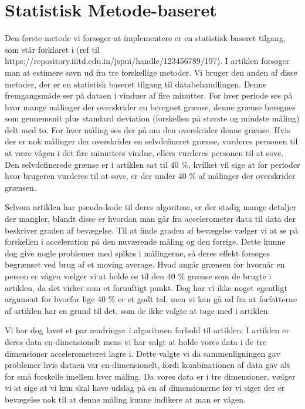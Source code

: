 \section{Statistisk Metode-baseret}
Den første metode vi forsøger at implementere er en statistisk baseret tilgang, som står forklaret i (ref til https://repository.iiitd.edu.in/jspui/handle/123456789/197).
I artiklen forsøger man at estimere søvn ud fra tre forskellige metoder.
Vi bruger den anden af disse metoder, der er en statistisk baseret tilgang til databehandlingen.
Denne fremgangsmåde ser på dataen i vinduer af fire minutter.
For hver periode ses på hvor mange målinger der overskrider en beregnet grænse, denne grænse beregnes som gennemsnit plus standard deviation (forskellen på største og mindste måling) delt med to.
For hver måling ses der på om den overskrider denne grænse.
Hvis der er nok målinger der overskrider en selvdefineret grænse, vurderes personen til at være vågen i det fire minutters vindue, ellers vurderes personen til at sove.
Den selvdefinerede grænse er i artiklen sat til 40 \%, hvilket vil sige at for perioder hvor brugeren vurderes til at sove, er der under 40 \% af målinger der overskrider grænsen.

Selvom artiklen har pseudo-kode til deres algoritme, er der stadig mange detaljer der mangler, blandt disse er hvordan man går fra accelerometer data til data der beskriver graden af bevægelse.
Til at finde graden af bevægelse vælger vi at se på forskellen i acceleration på den nuværende måling og den forrige.
Dette kunne dog give nogle problemer med spikes i målingerne, så deres effekt forsøges begrænset ved brug af et moving average.
Hvad angår grænsen for hvornår en person er vågen vælger vi at holde os til den 40 \% grænse som de brugte i artiklen, da det virker som et fornuftigt punkt.
Dog har vi ikke noget egentligt argument for hvorfor lige 40 \% er et godt tal, men vi kan gå ud fra at forfatterne af artiklen har en grund til det, som de ikke valgte at tage med i artiklen.

Vi har dog lavet et par ændringer i algoritmen forhold til artiklen.
I artiklen er deres data en-dimensionelt mens vi har valgt at holde vores data i de tre dimensioner accelerometeret lagre i.
Dette valgte vi da sammenligningen gav problemer hvis dataen var en-dimensionelt, fordi kombinationen af data gav alt for små forskelle imellem hver måling.
Da vores data er i tre dimensioner, vælger vi at sige at vi kun skal have udslag på en af dimensionerne før vi siger der er bevægelse nok til at denne måling kunne indikere at man er vågen.

